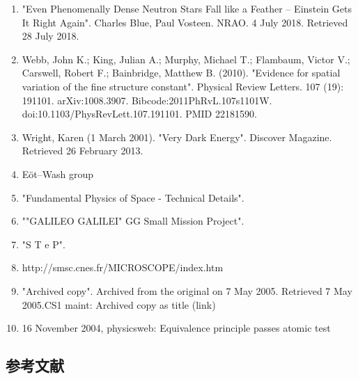 \begin{enumerate}
\item "Even Phenomenally Dense Neutron Stars Fall like a Feather – Einstein Gets It Right Again". Charles Blue, Paul Vosteen. NRAO. 4 July 2018. Retrieved 28 July 2018.
\item Webb, John K.; King, Julian A.; Murphy, Michael T.; Flambaum, Victor V.; Carswell, Robert F.; Bainbridge, Matthew B. (2010). "Evidence for spatial variation of the fine structure constant". Physical Review Letters. 107 (19): 191101. arXiv:1008.3907. Bibcode:2011PhRvL.107s1101W. doi:10.1103/PhysRevLett.107.191101. PMID 22181590.
\item Wright, Karen (1 March 2001). "Very Dark Energy". Discover Magazine. Retrieved 26 February 2013.
\item Eöt–Wash group
\item "Fundamental Physics of Space - Technical Details".
\item ""GALILEO GALILEI" GG Small Mission Project".
\item "S T e P".
\item http://smsc.cnes.fr/MICROSCOPE/index.htm
\item "Archived copy". Archived from the original on 7 May 2005. Retrieved 7 May 2005.CS1 maint: Archived copy as title (link)
\item 16 November 2004, physicsweb: Equivalence principle passes atomic test
\end{enumerate}


\subsection{参考文献}